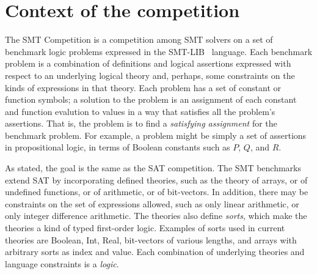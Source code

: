 \documentclass[twoside,11pt]{article}
\begin{document}
\section{Context of the competition}
\label{sec:context}

The SMT Competition is a competition among SMT solvers on a set of benchmark logic problems expressed in the SMT-LIB~\cite{BarST-RR-10} language. Each benchmark problem is a combination of definitions and logical assertions expressed with respect to an underlying logical theory and, perhaps, some constraints on the kinds of expressions in that theory. Each problem has a set of constant or function symbols; a solution to the problem is an assignment of each constant and function evalution to values in a way that satisfies all the problem's assertions. That is, the problem is to find a \textit{satisfying assignment} for the benchmark problem. For example, a problem might be simply a set of assertions in 
propositional logic, in terms of Boolean constants such as $P$, $Q$, and $R$.

As stated, the goal is the same as the SAT competition. The SMT benchmarks extend SAT by incorporating defined theories, such as the theory of arrays, or of undefined functions, or of arithmetic, or of bit-vectors. In addition, there may be constraints on the set of expressions allowed, such as only linear arithmetic, or only integer difference arithmetic. The theories also define \textit{sorts}, which make the theories a kind of typed first-order logic. Examples of sorts used in current theories are Boolean, Int, Real, bit-vectors of various lengths, and arrays with arbitrary sorts as index and value. Each combination of underlying theories and language constraints is a \textit{logic}.
\end{document}
